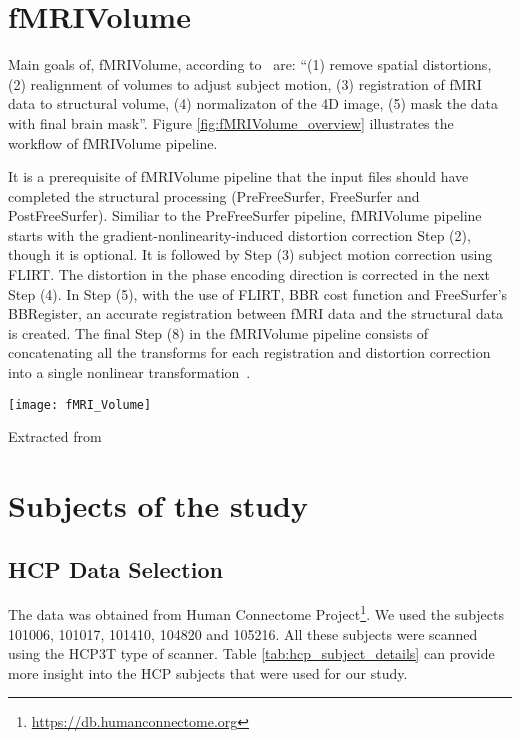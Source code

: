 
\section{fMRIVolume} \label{sec:fMRIVolume}
Main goals of, fMRIVolume, according to~\cite{Gla13} are: ``(1) remove spatial distortions, (2) realignment of volumes to adjust subject motion, (3) registration of fMRI data to structural volume, (4) normalizaton of the 4D image, (5) mask the data with final brain mask''. Figure \ref{fig:fMRIVolume_overview} illustrates the workflow of fMRIVolume pipeline.

It is a prerequisite of fMRIVolume pipeline that the input files should have completed the structural processing (PreFreeSurfer, FreeSurfer and PostFreeSurfer). Similiar to the PreFreeSurfer pipeline, fMRIVolume pipeline starts with the gradient-nonlinearity-induced distortion correction Step (2), though it is optional. It is followed by Step (3) subject motion correction using FLIRT. The distortion in the phase encoding direction is corrected in the next Step (4). In Step (5), with the use of FLIRT, BBR cost function and FreeSurfer's BBRegister, an accurate registration between fMRI data and the structural data is created. The final Step (8) in the fMRIVolume pipeline consists of concatenating all the transforms for each registration and distortion correction into a single nonlinear transformation~\cite{Gla13}.

\begin{center}
  \texttt{[image: fMRI\_Volume]}
  \label{fig:fMRIVolume_overview}
  \caption*{Extracted from \cite{Gla13}}
\end{center}

\section{Subjects of the study}\label{subjects_used}
\subsection{HCP Data Selection}
The data was obtained from Human Connectome Project\footnote{\url{https://db.humanconnectome.org}}. We used the subjects 101006, 101017, 101410, 104820 and 105216. All these subjects were scanned using the HCP3T type of scanner. Table \ref{tab:hcp_subject_details} can provide more insight into the HCP subjects that were used for our study.

